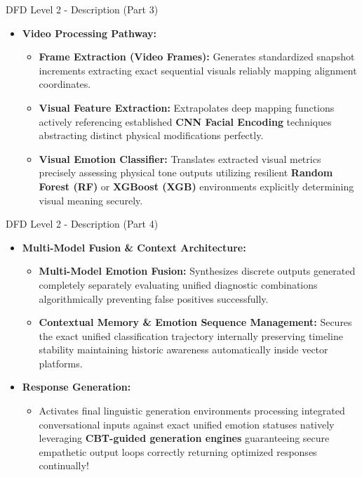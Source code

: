 \documentclass{beamer}
\begin{document}
\begin{frame}{DFD Level 2 - Description (Part 3)}
\begin{itemize}
    \item \textbf{Video Processing Pathway:}
    \begin{itemize}
        \item \textbf{Frame Extraction (Video Frames):} Generates standardized snapshot increments extracting exact sequential visuals reliably mapping alignment coordinates.
        \item \textbf{Visual Feature Extraction:} Extrapolates deep mapping functions actively referencing established \textbf{CNN Facial Encoding} techniques abstracting distinct physical modifications perfectly.
        \item \textbf{Visual Emotion Classifier:} Translates extracted visual metrics precisely assessing physical tone outputs utilizing resilient \textbf{Random Forest (RF)} or \textbf{XGBoost (XGB)} environments explicitly determining visual meaning securely.
    \end{itemize}
\end{itemize}
\end{frame}

\begin{frame}{DFD Level 2 - Description (Part 4)}
\begin{itemize}
    \item \textbf{Multi-Model Fusion \& Context Architecture:}
    \begin{itemize}
        \item \textbf{Multi-Model Emotion Fusion:} Synthesizes discrete outputs generated completely separately evaluating unified diagnostic combinations algorithmically preventing false positives successfully.
        \item \textbf{Contextual Memory \& Emotion Sequence Management:} Secures the exact unified classification trajectory internally preserving timeline stability maintaining historic awareness automatically inside vector platforms.
    \end{itemize}
    
    \vspace{0.3cm}
    \item \textbf{Response Generation:}
    \begin{itemize}
        \item Activates final linguistic generation environments processing integrated conversational inputs against exact unified emotion statuses natively leveraging \textbf{CBT-guided generation engines} guaranteeing secure empathetic output loops correctly returning optimized responses continually!
    \end{itemize}
\end{itemize}
\end{frame}
\end{document}
